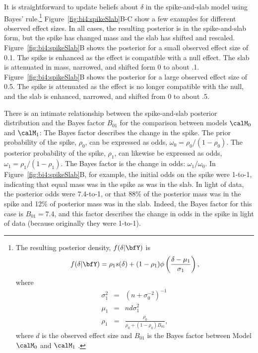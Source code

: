 It is straightforward  to update beliefs about $\delta$ in the spike-and-slab model using Bayes' rule.\footnote{The resulting posterior density, $f(\delta|\bfY)$  is 
\[
f(\delta | \bfY) = \rho_1 s(\delta) + (1-\rho_1)\phi\left(\frac{\delta-\mu_1}{\sigma_1}\right),
\]
where
\begin{eqnarray*}
\sigma^2_1 &=& (n+\sigma_0^{-2})^{-1}\\
\mu_1 &=& nd\sigma^2_1\\ 
\rho_1 &=& \frac{\rho_0}{\rho_0+(1-\rho_0)B_{01}},
\end{eqnarray*}
where $d$ is the observed effect size and $B_{01}$ is the Bayes factor between Model $\calM_0$ and $\calM_1$ .
}
Figure~\ref{fig:bi4:spikeSlab}B-C show a few examples for different observed effect sizes.  In all cases, the resulting posterior is in the spike-and-slab form, but the spike has changed mass and the slab has shifted and rescaled.  Figure~\ref{fig:bi4:spikeSlab}B shows the posterior for a small observed effect size of 0.1. The spike is enhanced as the effect is compatible with a null effect.  The slab is attenuated in mass, narrowed, and shifted form 0 to about .1.  Figure~\ref{fig:bi4:spikeSlab}B shows the posterior for a large observed effect size of 0.5.  The spike is attenuated as the effect is no longer compatible with the null, and the slab is enhanced, narrowed, and shifted from 0 to about .5.  
  
There is an intimate relationship between the spike-and-slab posterior distribution and the Bayes factor $B_{01}$ for the comparison between models $\calM_0$ and $\calM_1$: The Bayes factor describes the change in the spike.  The prior probability of the spike, $\rho_0$, can be expressed as odds, $\omega_0=\rho_0/(1-\rho_0)$.  The posterior probability of the spike, $\rho_1$, can likewise be expressed as odds, $\omega_1=\rho_1/(1-\rho_1)$.   The Bayes factor is the change in odds: $\omega_1/\omega_0$.   In Figure~\ref{fig:bi4:spikeSlab}B, for example, the initial odds on the spike were 1-to-1, indicating that equal mass was in the spike as was in the slab.  In light of data, the posterior odds were 7.4-to-1, or that 88\% of the posterior mass was in the spike and 12\% of posterior mass was in the slab.  Indeed, the Bayes factor for this case is $B_{01}=7.4$, and this factor describes the change in odds in the spike in light of data (because originally they were 1-to-1).


